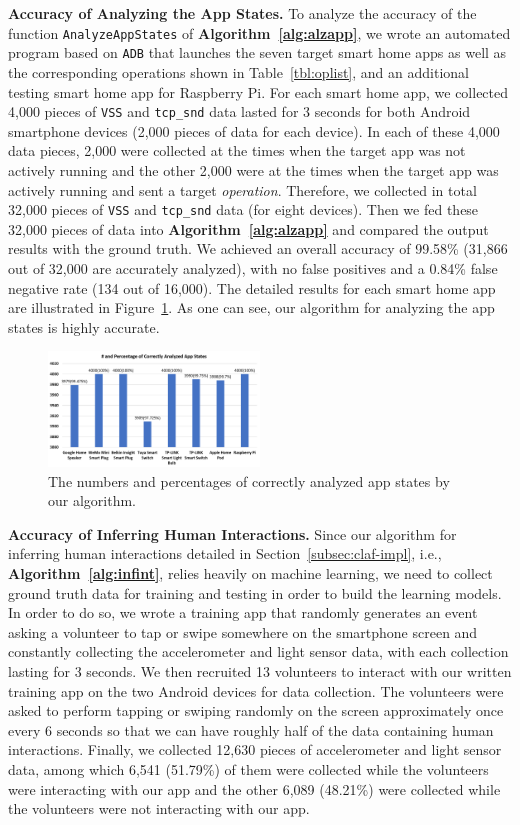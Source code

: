 \documentclass[letterpaper,12pt]{article}
\begin{document}
\textbf{Accuracy of Analyzing the App States.} 
To analyze the accuracy of the function \texttt{AnalyzeAppStates} of {\bf Algorithm~\ref{alg:alzapp}}, we wrote an automated program based on \texttt{ADB} that launches the seven target smart home apps as well as the corresponding operations shown in Table~\ref{tbl:oplist}, and an additional testing smart home app for Raspberry Pi. For each smart home app, we collected 4,000 pieces of \texttt{VSS} and \texttt{tcp\_snd} data lasted for 3 seconds for both Android smartphone devices (2,000 pieces of data for each device). In each of these 4,000 data pieces, 2,000 were collected at the times when the target app was not actively running and the other 2,000 were at the times when the target app was actively running and sent a target \textit{operation}. Therefore, we collected in total 32,000 pieces of \texttt{VSS} and \texttt{tcp\_snd} data (for eight devices). Then we fed these 32,000 pieces of data into  {\bf Algorithm~\ref{alg:alzapp}} and compared the output results with the ground truth. We achieved an overall accuracy of 99.58\% (31,866 out of 32,000 are accurately analyzed), with no false positives and a 0.84\% false negative rate (134 out of 16,000). The detailed results for each smart home app are illustrated in Figure~\ref{fig:appstate}. As one can see, our algorithm for analyzing the app states is highly accurate.

\begin{figure}[!htb]
        \centering
        \includegraphics[width=0.5\textwidth]{appstate.png}
        \caption{The numbers and percentages of correctly analyzed app states by our algorithm.}
        \label{fig:appstate}
\end{figure}

\textbf{Accuracy of Inferring Human Interactions.} 
Since our algorithm for inferring human interactions detailed in Section~\ref{subsec:claf-impl}, i.e., {\bf Algorithm~\ref{alg:infint}}, relies heavily on machine learning, we need to collect ground truth data for training and testing in order to build the learning models. In order to do so, we wrote a training app that randomly generates an event asking a volunteer to tap or swipe somewhere on the smartphone screen and constantly collecting the accelerometer and light sensor data, with each collection lasting for 3 seconds. We then recruited 13 volunteers to interact with our written training app on the two Android devices for data collection. The volunteers were asked to perform tapping or swiping randomly on the screen approximately once every 6 seconds so that we can have roughly half of the data containing human interactions. Finally, we collected 12,630 pieces of accelerometer and light sensor data, among which 6,541 (51.79\%) of them were collected while the volunteers were interacting with our app and the other 6,089 (48.21\%) were collected while the volunteers were not interacting with our app. 
\end{document}
